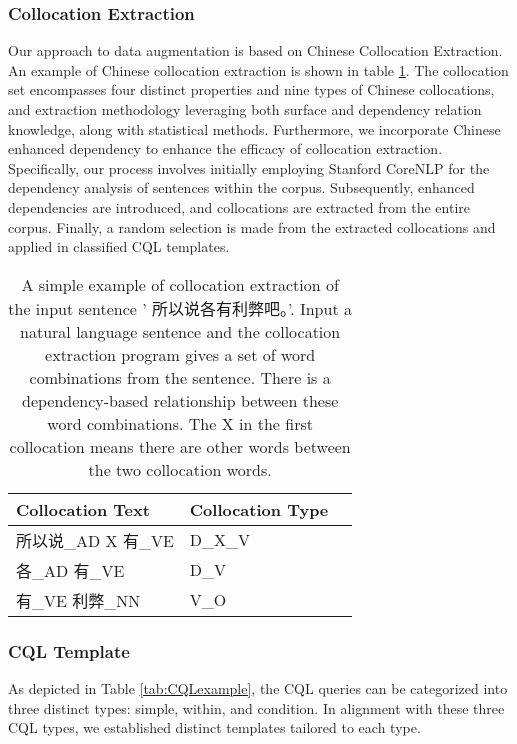 \documentclass[11pt]{article}
\begin{document}
\begin{CJK*}{UTF8}{gbsn}
\subsubsection{Collocation Extraction}

Our approach to data augmentation is based on Chinese Collocation Extraction\citep{hucollocation}. An example of Chinese collocation extraction is shown in table \ref{tab:collexample}. The collocation set encompasses four distinct properties and nine types of Chinese collocations, and extraction methodology leveraging both surface and dependency relation knowledge, along with statistical methods. Furthermore, we incorporate Chinese enhanced dependency\citep{yujingsi} to enhance the efficacy of collocation extraction. Specifically, our process involves initially employing Stanford CoreNLP\citep{corenlp} for the dependency analysis of sentences within the corpus. Subsequently, enhanced dependencies are introduced, and collocations are extracted from the entire corpus. Finally, a random selection is made from the extracted collocations and applied in classified CQL templates.

\begin{table}
    \centering
    \begin{tabular}{lp{9em}p{9em}} 
    \hline
    \textbf{Collocation Text} & \textbf{Collocation Type} \\
    \hline
    所以说\_AD	X	有\_VE	&D\_X\_V \\
    各\_AD	有\_VE	& D\_V \\
    有\_VE	利弊\_NN	& V\_O \\ 
    \hline
    \end{tabular}
    \caption{A simple example of collocation extraction of the input sentence '
    所以说各有利弊吧。'. Input a natural language sentence and the collocation extraction program gives a set of word combinations from the sentence. There is a dependency-based relationship between these word combinations. The X in the first collocation means there are other words between the two collocation words.}
    \label{tab:collexample}
\end{table}

\subsubsection{CQL Template}
As depicted in Table \ref{tab:CQLexample}, the CQL queries can be categorized into three distinct types: simple, within, and condition. In alignment with these three CQL types, we established distinct templates tailored to each type.


\end{CJK*}
\end{document}
